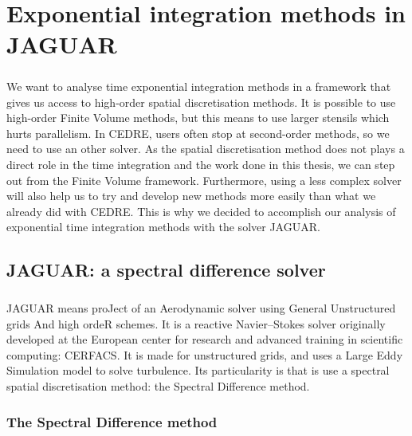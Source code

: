 \chapter{Exponential integration methods in JAGUAR}

  \paragraph{}
  We want to analyse time exponential integration methods in a framework that gives us access to high-order spatial discretisation methods.
  It is possible to use high-order Finite Volume methods, but this means to use larger stensils which hurts parallelism.
  In CEDRE, users often stop at second-order methods, so we need to use an other solver.
  As the spatial discretisation method does not plays a direct role in the time integration and the work done in this thesis, we can step out from the Finite Volume framework.
  Furthermore, using a less complex solver will also help us to try and develop new methods more easily than what we already did with CEDRE.
  This is why we decided to accomplish our analysis of exponential time integration methods with the solver JAGUAR.


  \section{JAGUAR: a spectral difference solver}

    \paragraph{}
    JAGUAR means proJect of an Aerodynamic solver using General Unstructured grids And high ordeR schemes.
    It is a reactive Navier--Stokes solver originally developed at the European center for research and advanced training in scientific computing: CERFACS.
    It is made for unstructured grids, and uses a Large Eddy Simulation model to solve turbulence.
    Its particularity is that is use a spectral spatial discretisation method: the Spectral Difference method.


    \subsection{The Spectral Difference method}


